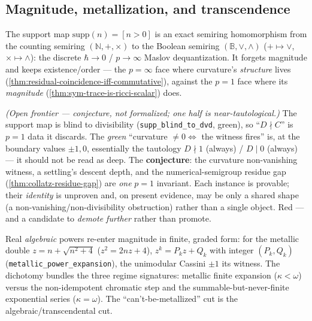 \subsection{Magnitude, metallization, and transcendence}

\begin{theorem}\label{thm:support-dequantization}\leanok{}
The support map $\mathrm{supp}(n)=[n>0]$ is an exact semiring homomorphism from the counting semiring
$(\mathbb N,+,\times)$ to the Boolean semiring $(\mathbb B,\vee,\wedge)$ ($+\mapsto\vee$,
$\times\mapsto\wedge$): the discrete $\hbar\to0$ / $p\to\infty$ Maslov dequantization. It forgets
magnitude and keeps existence/order --- the $p=\infty$ face where curvature's \emph{structure} lives
(\cref{thm:residual-coincidence-iff-commutative}), against the $p=1$ face where its \emph{magnitude}
(\cref{thm:sym-trace-is-ricci-scalar}) does.
\end{theorem}

\begin{theorem}\label{thm:divisibility-witness-unification}\notready{}
\emph{(Open frontier --- conjecture, not formalized; one half is near-tautological.)} The support map
is blind to divisibility (\texttt{supp\_blind\_to\_dvd}, green), so ``$D\nmid C$'' is $p=1$ data it
discards. The \emph{green} ``curvature $\neq 0 \iff$ the witness fires'' is, at the boundary values
$\pm1,0$, essentially the tautology $D\nmid 1$ (always) / $D\mid 0$ (always) --- it should not be read
as deep. The \textbf{conjecture}: the curvature non-vanishing witness, a settling's descent depth, and
the numerical-semigroup residue gap (\cref{thm:collatz-residue-gap}) are \emph{one} $p=1$ invariant. Each
instance is provable; their \emph{identity} is unproven and, on present evidence, may be only a shared
shape (a non-vanishing/non-divisibility obstruction) rather than a single object. Red --- and a
candidate to \emph{demote further} rather than promote.
\end{theorem}

\begin{theorem}\label{thm:metallic-power-dichotomy}\leanok{}
Real \emph{algebraic} powers re-enter magnitude in finite, graded form: for the metallic double
$z=n+\sqrt{n^2+4}$ ($z^2=2nz+4$), $z^k = P_k z + Q_k$ with integer $(P_k,Q_k)$
(\texttt{metallic\_power\_expansion}), the unimodular Cassini $\pm1$ its witness. The dichotomy bundles
the three regime signatures: metallic finite expansion ($\kappa<\omega$) versus the non-idempotent
chromatic step and the summable-but-never-finite exponential series ($\kappa=\omega$). The
``can't-be-metallized'' cut is the algebraic/transcendental cut.
\end{theorem}

